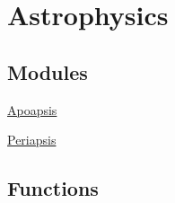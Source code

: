 \hypertarget{group___astrophysics}{}\section{Astrophysics}
\label{group___astrophysics}
\subsection*{Modules}
\begin{DoxyCompactItemize}
\item 
\hyperlink{group___apoapsis}{Apoapsis}
\item 
\hyperlink{group___periapsis}{Periapsis}
\end{DoxyCompactItemize}
\subsection*{Functions}
